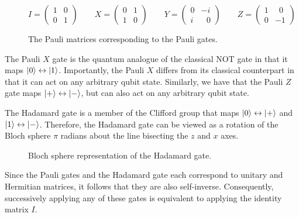 \begin{figure}[H]
    \centering
    \begin{equation*}
        I = \begin{pmatrix} 1 & 0 \\ 0 & 1\end{pmatrix} \qquad
        X = \begin{pmatrix} 0 & 1 \\ 1 & 0\end{pmatrix} \qquad
        Y = \begin{pmatrix} 0 & -i \\ i & \,\,\,\,0\end{pmatrix} \qquad
        Z = \begin{pmatrix} 1 & \,\,\,0 \\ 0 & -1\end{pmatrix}
    \end{equation*}
    \caption{The Pauli matrices corresponding to the Pauli gates.}
    \label{pauli-matrices}
\end{figure}

The Pauli $X$ gate is the quantum analogue of the classical NOT gate in that it maps $\ket 0 \leftrightarrow \ket 1$. Importantly, the Pauli $X$ differs from its classical counterpart in that it can act on any arbitrary qubit state. Similarly, we have that the Pauli $Z$ gate maps $\ket + \leftrightarrow \ket -$, but can also act on any arbitrary qubit state.

The Hadamard gate is a member of the Clifford group that maps $\ket 0 \leftrightarrow \ket +$ and $\ket 1 \leftrightarrow \ket -$. Therefore, the Hadamard gate can be viewed as a rotation of the Bloch sphere $\pi$ radians about the line bisecting the $z$ and $x$ axes.

\begin{figure}[H]
    \centering
    \caption{Bloch sphere representation of the Hadamard gate.}
    \label{hadamard-definition}
\end{figure}

Since the Pauli gates and the Hadamard gate each correspond to unitary and Hermitian matrices, it follows that they are also self-inverse. Consequently, successively applying any of these gates is equivalent to applying the identity matrix $I$.

